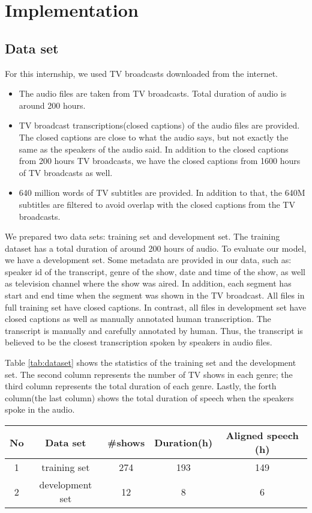 \chapter{Implementation}

\section{Data set}
For this internship, we used TV broadcasts downloaded from the internet. 
\begin{itemize}
\item The audio files are taken from TV broadcasts. Total duration of audio is around 200 hours.
\item TV broadcast transcriptions(closed captions) of the audio files are provided. The closed captions are close to what the audio says, but not exactly the same as the speakers of the audio said. In addition to the closed captions from 200 hours TV broadcasts, we have the closed captions from 1600 hours of TV broadcasts as well.
\item 640 million words of TV subtitles are provided. In addition to that, the 640M subtitles are filtered to avoid overlap with the closed captions from the TV broadcasts.
\end{itemize} 

We prepared two data sets: training set and development set. The training dataset has a total duration of around 200 hours of audio. To evaluate our model, we have a development set. Some metadata are provided in our data, such as: speaker id of the transcript, genre of the show, date and time of the show, as well as television channel where the show was aired. In addition, each segment has start and end time when the segment was shown in the TV broadcast. All files in full training set have closed captions. In contrast, all files in development set have closed captions as well as manually annotated human transcription. The transcript is manually and carefully annotated by human. Thus, the transcript is believed to be the closest transcription spoken by speakers in audio files. 

Table \ref{tab:dataset} shows the statistics of the training set and the development set. The second column represents the number of TV shows in each genre; the third column represents the total duration of each genre. Lastly, the forth column(the last column) shows the total duration of speech when the speakers spoke in the audio.
\begin{center}
\label{tab:dataset}
\begin{tabular}{ | c | c | c | c | c |  }
\hline
No & Data set & \#shows & Duration(h) & Aligned speech (h) \\ \hline
1 & training set & 274 & 193  & 149 \\ \hline
2 & development set & 12 & 8 & 6 \\ \hline
\end{tabular}
\end{center}

